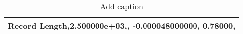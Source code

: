 \begin{table}[htbp]
  \centering
  \caption{Add caption}
    \begin{tabular}{r}
    \toprule
    Record Length,2.500000e+03,,  -0.000048000000,   0.78000, \\
    \bottomrule
    \end{tabular}%
  \label{tab:addlabel}%
\end{table}%
